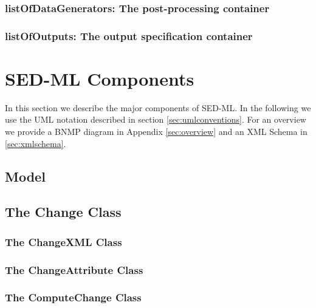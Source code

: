  \subsubsection{listOfDataGenerators: The post-processing container}
 

 \subsubsection{listOfOutputs: The output specification container}
 



\section{SED-ML Components}
In this section we describe the major components of SED-ML. In the following we 
use the UML notation described in section \ref{sec:umlconventions}. For an overview we 
provide a BNMP diagram in Appendix \ref{sec:overview} and an XML Schema in 
\ref{sec:xmlschema}. 

  \subsection{Model}
  

  \subsection[Change]{The Change Class}
  

  \subsubsection[ChangeXML]{The ChangeXML Class}
  

  \subsubsection[ChangeAttribute]{The ChangeAttribute Class}
  

  \subsubsection[ComputeChange]{The ComputeChange Class}
  

